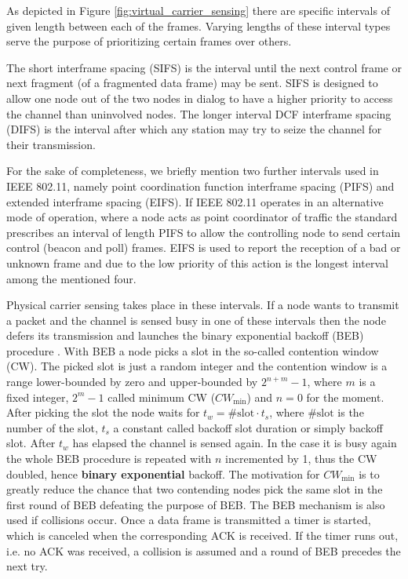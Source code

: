 As depicted in Figure \ref{fig:virtual_carrier_sensing} there are specific intervals of given length between each of the frames. Varying lengths of these interval types serve the purpose of prioritizing certain frames over others.

The short interframe spacing (SIFS) is the interval until the next control frame or next fragment (of a fragmented data frame) may be sent. SIFS is designed to allow one node out of the two nodes in dialog to have a higher priority to access the channel than uninvolved nodes. The longer interval DCF interframe spacing (DIFS) is the interval after which any station may try to seize the channel for their transmission.

For the sake of completeness, we briefly mention two further intervals used in IEEE 802.11, namely point coordination function interframe spacing (PIFS) and extended interframe spacing (EIFS). If IEEE 802.11 operates in an alternative mode of operation, where a node acts as point coordinator of traffic the standard prescribes an interval of length PIFS to allow the controlling node to send certain control (beacon and poll) frames. EIFS is used to report the reception of a bad or unknown frame and due to the low priority of this action is the longest interval among the mentioned four. 

Physical carrier sensing takes place in these intervals. If a node wants to transmit a packet and the channel is sensed busy in one of these intervals then the node defers its transmission and launches the binary exponential backoff (BEB) procedure \cite{Gast05}. With BEB a node picks a slot in the so-called contention window (CW). The picked slot is just a random integer and the contention window is a range lower-bounded by zero and upper-bounded by $2^{n+m}-1$, where $m$ is a fixed integer, $2^m-1$ called minimum CW ($CW_\text{min}$) and $n=0$ for the moment. After picking the slot the node waits for $t_w = \text{\#slot} \cdot t_s$, where $\text{\#slot}$ is the number of the slot, $t_s$ a constant called backoff slot duration or simply backoff slot. After $t_w$ has elapsed the channel is sensed again. In the case it is busy again the whole BEB procedure is repeated with $n$ incremented by 1, thus the CW doubled, hence \textbf{binary exponential} backoff.  The motivation for $CW_\text{min}$ is to greatly reduce the chance that two contending nodes pick the same slot in the first round of BEB defeating the purpose of BEB. The BEB mechanism is also used if collisions occur. Once a data frame is transmitted a timer is started, which is canceled when the corresponding ACK is received. If the timer runs out, i.e. no ACK was received, a collision is assumed and a round of BEB precedes the next try.    

